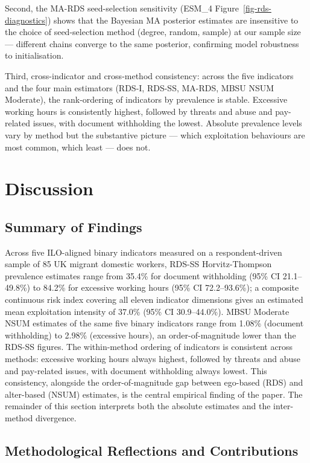 \documentclass[
  12pt,
  letterpaper,
  DIV=11,
  numbers=noendperiod]{scrartcl}
\begin{document}
Second, the MA-RDS seed-selection sensitivity (ESM\_4
Figure~\ref{fig-rds-diagnostics}) shows that the Bayesian MA posterior
estimates are insensitive to the choice of seed-selection method
(degree, random, sample) at our sample size --- different chains
converge to the same posterior, confirming model robustness to
initialisation.

Third, cross-indicator and cross-method consistency: across the five
indicators and the four main estimators (RDS-I, RDS-SS, MA-RDS, MBSU
NSUM Moderate), the rank-ordering of indicators by prevalence is stable.
Excessive working hours is consistently highest, followed by threats and
abuse and pay-related issues, with document withholding the lowest.
Absolute prevalence levels vary by method but the substantive picture
--- which exploitation behaviours are most common, which least --- does
not.

\section{Discussion}\label{sec-discussion}

\subsection{Summary of Findings}\label{sec-summary}

Across five ILO-aligned binary indicators measured on a
respondent-driven sample of 85 UK migrant domestic workers, RDS-SS
Horvitz-Thompson prevalence estimates range from 35.4\% for document
withholding (95\% CI 21.1--49.8\%) to 84.2\% for excessive working hours
(95\% CI 72.2--93.6\%); a composite continuous risk index covering all
eleven indicator dimensions gives an estimated mean exploitation
intensity of 37.0\% (95\% CI 30.9--44.0\%). MBSU Moderate NSUM estimates
of the same five binary indicators range from 1.08\% (document
withholding) to 2.98\% (excessive hours), an order-of-magnitude lower
than the RDS-SS figures. The within-method ordering of indicators is
consistent across methods: excessive working hours always highest,
followed by threats and abuse and pay-related issues, with document
withholding always lowest. This consistency, alongside the
order-of-magnitude gap between ego-based (RDS) and alter-based (NSUM)
estimates, is the central empirical finding of the paper. The remainder
of this section interprets both the absolute estimates and the
inter-method divergence.

\subsection{Methodological Reflections and
Contributions}\label{sec-contributions}
\end{document}
